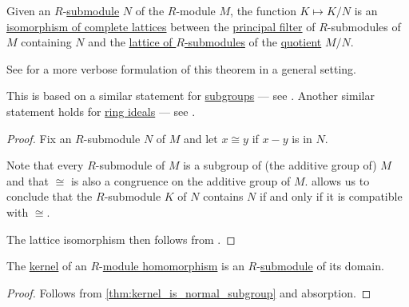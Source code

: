 \begin{theorem}\label{thm:lattice_theorem_for_submodules}
  Given an \( R \)-\hyperref[def:module/subobject]{submodule} \( N \) of the \( R \)-module \( M \), the function \( K \mapsto K / N \) is an \hyperref[def:lattice/morphism]{isomorphism of complete lattices} between the \hyperref[def:lattice_ideal/principal]{principal filter} of \( R \)-submodules of \( M \) containing \( N \) and the \hyperref[thm:semiring_of_ideals/lattice]{lattice of \( R \)-submodules} of the \hyperref[def:module/quotient]{quotient} \( M / N \).
\end{theorem}
\begin{comments}
  \item See  for a more verbose formulation of this theorem in a general setting.

  \item This is based on a similar statement for \hyperref[def:group/subobject]{subgroups} --- see . Another similar statement holds for \hyperref[def:ring/ideal]{ring ideals} --- see .
\end{comments}
\begin{proof}
  Fix an \( R \)-submodule \( N \) of \( M \) and let \( x \cong y \) if \( x - y \) is in \( N \).

  Note that every \( R \)-submodule of \( M \) is a subgroup of (the additive group of) \( M \) and that \( {\cong} \) is also a congruence on the additive group of \( M \).  allows us to conclude that the \( R \)-submodule \( K \) of \( N \) contains \( N \) if and only if it is compatible with \( {\cong} \).

  The lattice isomorphism then follows from .
\end{proof}

\begin{proposition}\label{thm:kernel_is_submodule}
  The \hyperref[def:module/kernel]{kernel} of an \( R \)-\hyperref[def:module/morphism]{module homomorphism} is an \( R \)-\hyperref[def:module/subobject]{submodule} of its domain.
\end{proposition}
\begin{proof}
  Follows from \cref{thm:kernel_is_normal_subgroup} and absorption.
\end{proof}

